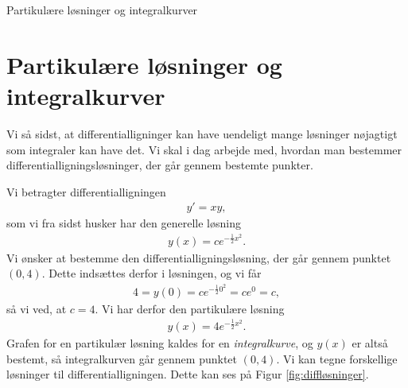 \begin{center}
\Huge
Partikulære løsninger og integralkurver
\end{center}

\section*{Partikulære løsninger og integralkurver}

Vi så sidst, at differentialligninger kan have uendeligt mange løsninger nøjagtigt som integraler kan have det. Vi skal i dag arbejde med, hvordan man bestemmer differentialligningsløsninger, der går gennem bestemte punkter. 

\begin{exa}
	Vi betragter differentialligningen 
	\begin{align*}
		y' = xy,
	\end{align*}
	som vi fra sidst husker har den generelle løsning 
	\begin{align*}
		y(x) = ce^{-\frac{1}{2}x^2}.
	\end{align*}
	Vi ønsker at bestemme den differentialligningsløsning, der går gennem punktet $(0,4)$.
	Dette indsættes derfor i løsningen, og vi får
	\begin{align*}
		4=y(0) = ce^{-\frac{1}{2}0^2} = ce^0= c, 
	\end{align*}
	så vi ved, at $c=4$. Vi har derfor den partikulære løsning 
	\begin{align*}
		y(x) = 4e^{-\frac{1}{2}x^2}.
	\end{align*}
	Grafen for en partikulær løsning kaldes for en \textit{integralkurve}, og $y(x)$ er altså
	bestemt, så integralkurven går gennem punktet $(0,4)$.
	Vi kan tegne forskellige løsninger til differentialligningen. Dette kan ses på Figur 
	\ref{fig:diffløsninger}.
	\begin{figure}[H]
		\centering
\end{figure}
\end{exa}
